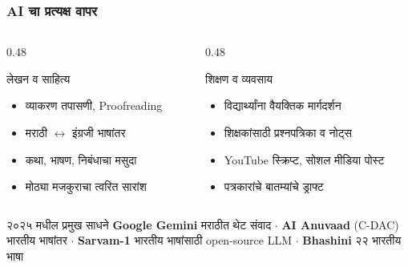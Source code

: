 \begin{frame}[fragile]\frametitle{AI चा प्रत्यक्ष वापर}

\begin{columns}[T]
\begin{column}{0.48\textwidth}
\begin{block}{लेखन व साहित्य}
\begin{itemize}
\item व्याकरण तपासणी, Proofreading
\item मराठी $\leftrightarrow$ इंग्रजी भाषांतर
\item कथा, भाषण, निबंधाचा मसुदा
\item मोठ्या मजकुराचा त्वरित सारांश
\end{itemize}
\end{block}
\end{column}
\begin{column}{0.48\textwidth}
\begin{block}{शिक्षण व व्यवसाय}
\begin{itemize}
\item विद्यार्थ्यांना वैयक्तिक मार्गदर्शन
\item शिक्षकांसाठी प्रश्नपत्रिका व नोट्स
\item YouTube स्क्रिप्ट, सोशल मीडिया पोस्ट
\item पत्रकारांचे बातम्यांचे ड्राफ्ट
\end{itemize}
\end{block}
\end{column}
\end{columns}

\vspace{0.2cm}
\begin{exampleblock}{२०२५ मधील प्रमुख साधने}
\textbf{Google Gemini} मराठीत थेट संवाद $\cdot$
\textbf{AI Anuvaad} (C-DAC) भारतीय भाषांतर $\cdot$
\textbf{Sarvam-1} भारतीय भाषांसाठी open-source LLM $\cdot$
\textbf{Bhashini} २२ भारतीय भाषा
\end{exampleblock}


\end{frame}

